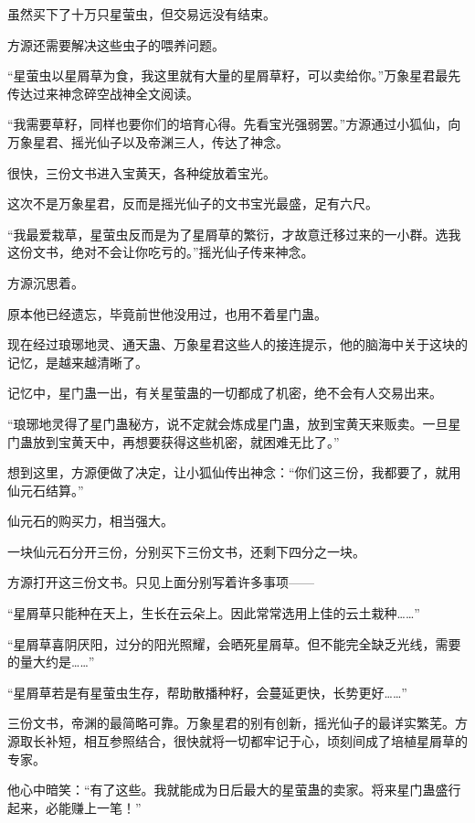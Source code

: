 
\begin{this_body}



虽然买下了十万只星萤虫，但交易远没有结束。

方源还需要解决这些虫子的喂养问题。

“星萤虫以星屑草为食，我这里就有大量的星屑草籽，可以卖给你。”万象星君最先传达过来神念碎空战神全文阅读。

“我需要草籽，同样也要你们的培育心得。先看宝光强弱罢。”方源通过小狐仙，向万象星君、摇光仙子以及帝渊三人，传达了神念。

很快，三份文书进入宝黄天，各种绽放着宝光。

这次不是万象星君，反而是摇光仙子的文书宝光最盛，足有六尺。

“我最爱栽草，星萤虫反而是为了星屑草的繁衍，才故意迁移过来的一小群。选我这份文书，绝对不会让你吃亏的。”摇光仙子传来神念。

方源沉思着。

原本他已经遗忘，毕竟前世他没用过，也用不着星门蛊。

现在经过琅琊地灵、通天蛊、万象星君这些人的接连提示，他的脑海中关于这块的记忆，是越来越清晰了。

记忆中，星门蛊一出，有关星萤蛊的一切都成了机密，绝不会有人交易出来。

“琅琊地灵得了星门蛊秘方，说不定就会炼成星门蛊，放到宝黄天来贩卖。一旦星门蛊放到宝黄天中，再想要获得这些机密，就困难无比了。”

想到这里，方源便做了决定，让小狐仙传出神念：“你们这三份，我都要了，就用仙元石结算。”

仙元石的购买力，相当强大。

一块仙元石分开三份，分别买下三份文书，还剩下四分之一块。

方源打开这三份文书。只见上面分别写着许多事项——

“星屑草只能种在天上，生长在云朵上。因此常常选用上佳的云土栽种……”

“星屑草喜阴厌阳，过分的阳光照耀，会晒死星屑草。但不能完全缺乏光线，需要的量大约是……”

“星屑草若是有星萤虫生存，帮助散播种籽，会蔓延更快，长势更好……”

三份文书，帝渊的最简略可靠。万象星君的别有创新，摇光仙子的最详实繁芜。方源取长补短，相互参照结合，很快就将一切都牢记于心，顷刻间成了培植星屑草的专家。

他心中暗笑：“有了这些。我就能成为日后最大的星萤蛊的卖家。将来星门蛊盛行起来，必能赚上一笔！”


\end{this_body}

